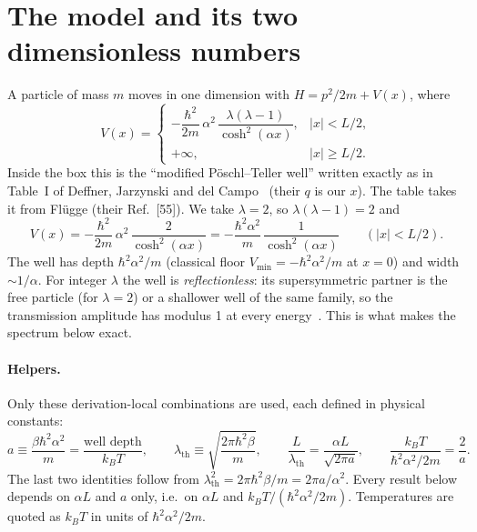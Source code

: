 \documentclass[11pt]{article}
\numberwithin{equation}{section}
\newcommand{\lth}{\lambda_{\mathrm{th}}}
\newcommand{\kB}{k_{B}}
\newcommand{\Eu}{\hbar^2\alpha^2/2m}
\begin{document}
\section{The model and its two dimensionless numbers}
\label{sec:model}
A particle of mass $m$ moves in one dimension with $H=p^2/2m+V(x)$, where
\begin{equation}
V(x)=\begin{cases}
-\dfrac{\hbar^2}{2m}\,\alpha^2\,\dfrac{\lambda(\lambda-1)}{\cosh^2(\alpha x)}, & |x|<L/2,\\[6pt]
+\infty, & |x|\ge L/2.
\end{cases}
\label{eq:Vgeneral}
\end{equation}
Inside the box this is the ``modified P\"oschl--Teller well'' written exactly as in Table~I of Deffner, Jarzynski and del Campo~\cite[p.~021013-9]{deffner2014} (their $q$ is our $x$). The table takes it from Fl\"ugge (their Ref.~[55]). We take $\lambda=2$, so $\lambda(\lambda-1)=2$ and
\begin{equation}
V(x)=-\frac{\hbar^2}{2m}\,\alpha^2\,\frac{2}{\cosh^2(\alpha x)}=-\frac{\hbar^2\alpha^2}{m}\,\frac{1}{\cosh^2(\alpha x)}\qquad(|x|<L/2).
\label{eq:V2}
\end{equation}
The well has depth $\hbar^2\alpha^2/m$ (classical floor $V_{\min}=-\hbar^2\alpha^2/m$ at $x=0$) and width $\sim1/\alpha$. For integer $\lambda$ the well is \emph{reflectionless}: its supersymmetric partner is the free particle (for $\lambda=2$) or a shallower well of the same family, so the transmission amplitude has modulus 1 at every energy~\cite[p.~18, Eqs.~(32)--(33); pp.~41--42, Eqs.~(150)--(153)]{CKS}. This is what makes the spectrum below exact.

\paragraph{Helpers.} Only these derivation-local combinations are used, each defined in physical constants:
\begin{equation}
a\equiv\frac{\beta\hbar^2\alpha^2}{m}=\frac{\text{well depth}}{\kB T},\qquad
\lth\equiv\sqrt{\frac{2\pi\hbar^2\beta}{m}},\qquad
\frac{L}{\lth}=\frac{\alpha L}{\sqrt{2\pi a}},\qquad
\frac{\kB T}{\Eu}=\frac{2}{a}.
\label{eq:helpers}
\end{equation}
The last two identities follow from $\lth^2=2\pi\hbar^2\beta/m=2\pi a/\alpha^2$. Every result below depends on $\alpha L$ and $a$ only, i.e.\ on $\alpha L$ and $\kB T/(\Eu)$. Temperatures are quoted as $\kB T$ in units of $\Eu$.
\end{document}
